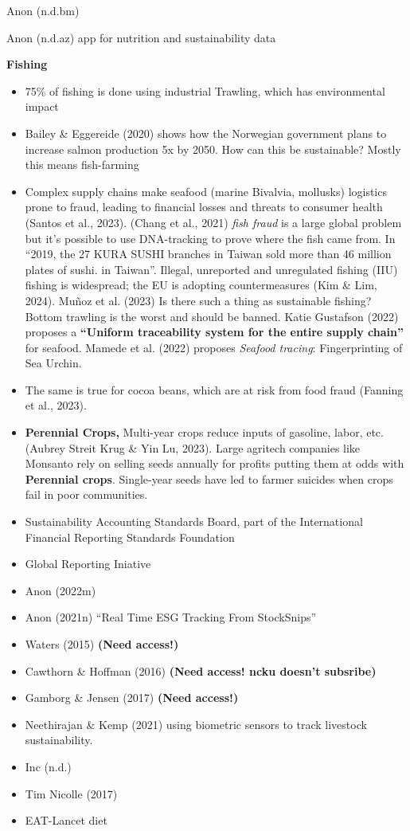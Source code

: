 \documentclass[
  letterpaper,
  DIV=11,
  numbers=noendperiod]{scrartcl}
\begin{document}
Anon (n.d.bm)

Anon (n.d.az) app for nutrition and sustainability data

\textbf{Fishing}

\begin{itemize}
\item
  75\% of fishing is done using industrial Trawling, which has
  environmental impact
\item
  Bailey \& Eggereide (2020) shows how the Norwegian government plans to
  increase salmon production 5x by 2050. How can this be sustainable?
  Mostly this means fish-farming
\item
  Complex supply chains make seafood (marine Bivalvia, mollusks)
  logistics prone to fraud, leading to financial losses and threats to
  consumer health (Santos et al., 2023). (Chang et al., 2021) \emph{fish
  fraud} is a large global problem but it's possible to use DNA-tracking
  to prove where the fish came from. In ``2019, the 27 KURA SUSHI
  branches in Taiwan sold more than 46 million plates of sushi. in
  Taiwan''. Illegal, unreported and unregulated fishing (IIU) fishing is
  widespread; the EU is adopting countermeasures (Kim \& Lim, 2024).
  Muñoz et al. (2023) Is there such a thing as sustainable fishing?
  Bottom trawling is the worst and should be banned. Katie Gustafson
  (2022) proposes a \textbf{``Uniform traceability system for the entire
  supply chain''} for seafood. Mamede et al. (2022) proposes
  \emph{Seafood tracing}: Fingerprinting of Sea Urchin.
\item
  The same is true for cocoa beans, which are at risk from food fraud
  (Fanning et al., 2023).
\item
  \textbf{Perennial Crops,} Multi-year crops reduce inputs of gasoline,
  labor, etc. (Aubrey Streit Krug \& Yin Lu, 2023). Large agritech
  companies like Monsanto rely on selling seeds annually for profits
  putting them at odds with \textbf{Perennial crops}. Single-year seeds
  have led to farmer suicides when crops fail in poor communities.
\item
  Sustainability Accounting Standards Board, part of the International
  Financial Reporting Standards Foundation
\item
  Global Reporting Iniative
\item
  Anon (2022m)
\item
  Anon (2021n) ``Real Time ESG Tracking From StockSnips''
\item
  Waters (2015) \textbf{(Need access!)}
\item
  Cawthorn \& Hoffman (2016) \textbf{(Need access! ncku doesn't
  subsribe)}
\item
  Gamborg \& Jensen (2017) \textbf{(Need access!)}
\item
  Neethirajan \& Kemp (2021) using biometric sensors to track livestock
  sustainability.
\item
  Inc (n.d.)
\item
  Tim Nicolle (2017)
\item
  EAT-Lancet diet
\end{itemize}
\end{document}
